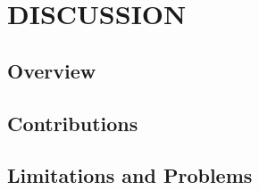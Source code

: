 \chapter{DISCUSSION}

\section{Overview}

\section{Contributions}

\section{Limitations and Problems}